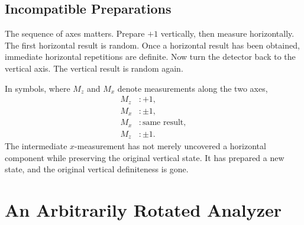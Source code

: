 \subsection{Incompatible Preparations}

The sequence of axes matters. Prepare \(+1\) vertically, then measure horizontally. The first horizontal result is random. Once a horizontal result has been obtained, immediate horizontal repetitions are definite. Now turn the detector back to the vertical axis. The vertical result is random again.

In symbols, where \(M_z\) and \(M_x\) denote measurements along the two axes,
\begin{equation}
\begin{aligned}
  M_z&:+1,\\
  M_x&:\pm1,\\
  M_x&:\text{same result},\\
  M_z&:\pm1.
\end{aligned}
\end{equation}
The intermediate \(x\)-measurement has not merely uncovered a horizontal component while preserving the original vertical state. It has prepared a new state, and the original vertical definiteness is gone.

\begin{classroomqa}
\end{classroomqa}

\begin{classroomqa}
\end{classroomqa}

\section{An Arbitrarily Rotated Analyzer}

